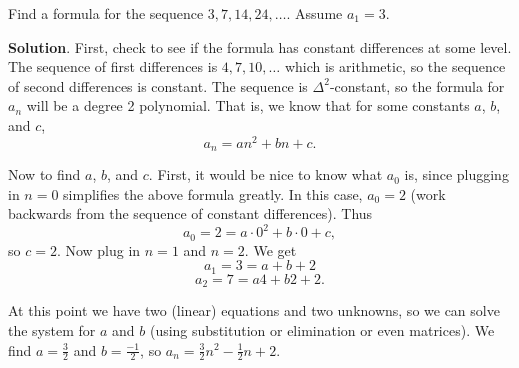 \documentclass[11pt,]{book}
\theoremstyle{ptxplainnotitle}
\theoremstyle{ptxplaintitle}
\theoremstyle{ptxdefinitionnotitle}
\theoremstyle{ptxdefinitiontitle}
\theoremstyle{ptxdefinitionnotitle}
\theoremstyle{ptxdefinitiontitle}
\theoremstyle{ptxdefinitionnotitle}
\theoremstyle{ptxdefinitiontitle}
\theoremstyle{ptxdefinitiontitlenonumber}
\theoremstyle{ptxdefinitiontitlenonumber}
\numberwithin{equation}{chapter}
\begin{document}
\begin{example}\label{example-15}
\hypertarget{p-372}{}%
Find a formula for the sequence \(3, 7, 14, 24,\ldots\). Assume \(a_1 = 3\).%
\par\smallskip%
\noindent\textbf{Solution}.\hypertarget{solution-44}{}\quad%
\hypertarget{p-373}{}%
First, check to see if the formula has constant differences at some level. The sequence of first differences is \(4, 7, 10, \ldots\) which is arithmetic, so the sequence of second differences is constant. The sequence is \(\Delta^2\)-constant, so the formula for \(a_n\) will be a degree 2 polynomial. That is, we know that for some constants \(a\), \(b\), and \(c\),%
\begin{equation*}
a_n = an^2 + bn + c.
\end{equation*}
%
\par
\hypertarget{p-374}{}%
Now to find \(a\), \(b\), and \(c\). First, it would be nice to know what \(a_0\) is, since plugging in \(n = 0\) simplifies the above formula greatly. In this case, \(a_0 = 2\) (work backwards from the sequence of constant differences). Thus%
\begin{equation*}
a_0 = 2 = a\cdot 0^2 + b \cdot 0 + c,
\end{equation*}
so \(c = 2\). Now plug in \(n =1\) and \(n = 2\). We get%
\begin{equation*}
a_1 = 3 = a + b + 2
\end{equation*}
%
\begin{equation*}
a_2 = 7 = a4 + b 2 + 2.
\end{equation*}
%
\par
\hypertarget{p-375}{}%
At this point we have two (linear) equations and two unknowns, so we can solve the system for \(a\) and \(b\) (using substitution or elimination or even matrices). We find \(a = \frac{3}{2}\) and \(b = \frac{-1}{2}\), so \(a_n = \frac{3}{2} n^2 - \frac{1}{2}n + 2\).%
\end{example}
\end{document}
